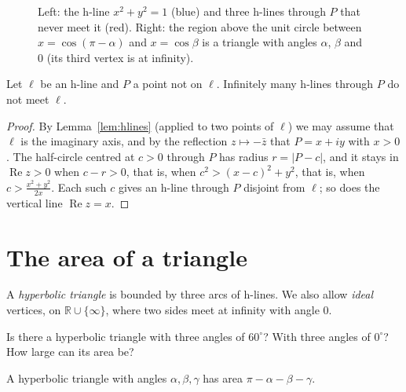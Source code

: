\begin{figure}[ht]
\centering
{}
\caption{Left: the h-line $x^2+y^2=1$ (blue) and three h-lines through $P$ that never meet it (red). Right: the region above the unit circle between
$x=\cos(\pi-\alpha)$ and $x=\cos\beta$ is a triangle with angles $\alpha$, $\beta$ and $0$ (its third vertex is at infinity).}
\label{fig:halfplane}
\end{figure}

\begin{proposition}\label{prop:parallels}
Let $\ell$ be an h-line and $P$ a point not on $\ell$. Infinitely many h-lines through $P$ do not meet $\ell$.
\end{proposition}

\begin{proof}
By Lemma~\ref{lem:hlines} (applied to two points of $\ell$) we may assume that $\ell$ is the imaginary axis, and by the reflection $z\mapsto-\bar z$ that
$P=x+iy$ with $x>0$. The half-circle centred at $c>0$ through $P$ has radius $r=|P-c|$, and it stays in $\operatorname{Re}z>0$ when $c-r>0$, that is, when
$c^2>(x-c)^2+y^2$, that is, when $c>\frac{x^2+y^2}{2x}$. Each such $c$ gives an h-line through $P$ disjoint from $\ell$; so does the vertical line
$\operatorname{Re}z=x$.
\end{proof}

\section{The area of a triangle}

A \emph{hyperbolic triangle} is bounded by three arcs of h-lines. We also allow \emph{ideal} vertices, on $\mathbb R\cup\{\infty\}$, where two sides meet at
infinity with angle $0$.

\begin{think}
Is there a hyperbolic triangle with three angles of $60^\circ$? With three angles of $0^\circ$? How large can its area be?
\end{think}

\begin{theorem}\label{thm:hyparea}
A hyperbolic triangle with angles $\alpha,\beta,\gamma$ has area $\pi-\alpha-\beta-\gamma$.
\end{theorem}

